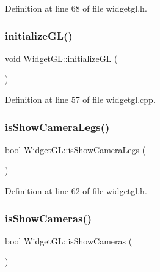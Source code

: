 Definition at line 68 of file widgetgl.\+h.

\mbox{\label{class_widget_g_l_a76b5b3c175bba9dd7411bb57c739aff0}} 
\subsubsection{\texorpdfstring{initializeGL()}{initializeGL()}}
{\footnotesize\ttfamily void Widget\+G\+L\+::initialize\+GL (\begin{DoxyParamCaption}{ }\end{DoxyParamCaption})\hspace{0.3cm}{\ttfamily [protected]}}



Definition at line 57 of file widgetgl.\+cpp.

\mbox{\label{class_widget_g_l_a3523c2fd883dbe4dd45dd5e2d59ee839}} 
\subsubsection{\texorpdfstring{isShowCameraLegs()}{isShowCameraLegs()}}
{\footnotesize\ttfamily bool Widget\+G\+L\+::is\+Show\+Camera\+Legs (\begin{DoxyParamCaption}{ }\end{DoxyParamCaption})\hspace{0.3cm}{\ttfamily [inline]}}



Definition at line 62 of file widgetgl.\+h.

\mbox{\label{class_widget_g_l_a883e76fb15861d1a09518b7b250cdca3}} 
\subsubsection{\texorpdfstring{isShowCameras()}{isShowCameras()}}
{\footnotesize\ttfamily bool Widget\+G\+L\+::is\+Show\+Cameras (\begin{DoxyParamCaption}{ }\end{DoxyParamCaption})\hspace{0.3cm}{\ttfamily [inline]}}



